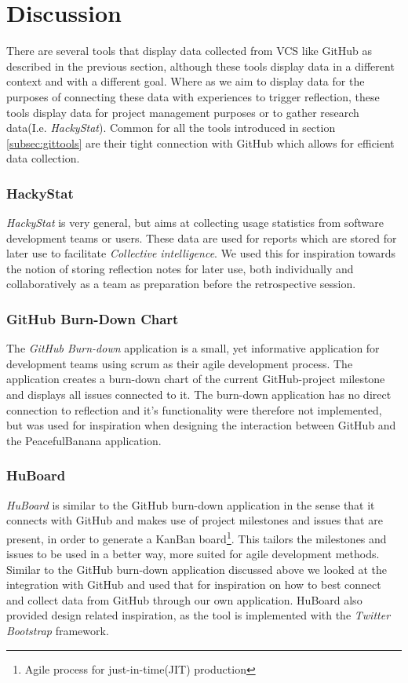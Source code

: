 \section{Discussion}
There are several tools that display data collected from VCS like GitHub as described in the previous section, although these tools display data in a different context and with a different goal. Where as we aim to display data for the purposes of connecting these data with experiences to trigger reflection, these tools display data for project management purposes or to gather research data(I.e. \emph{HackyStat}). Common for all the tools introduced in section \ref{subsec:gittools} are their tight connection with GitHub which allows for efficient data collection.

\subsubsection{HackyStat}
\emph{HackyStat} is very general, but aims at collecting usage statistics from software development teams or users. These data are used for reports which are stored for later use to facilitate \emph{Collective intelligence}. We used this for inspiration towards the notion of storing reflection notes for later use, both individually and collaboratively as a team as preparation before the retrospective session.   

\subsubsection{GitHub Burn-Down Chart}
The \emph{GitHub Burn-down} application is a small, yet informative application for development teams using scrum as their agile development process. The application creates a burn-down chart of the current GitHub-project milestone and displays all issues connected to it. The burn-down application has no direct connection to reflection and it's functionality were therefore not implemented, but was used for inspiration when designing the interaction between GitHub and the PeacefulBanana application. 

\subsubsection{HuBoard}
\emph{HuBoard} is similar to the GitHub burn-down application in the sense that it connects with GitHub and makes use of project milestones and issues that are present, in order to generate a KanBan board\footnote{Agile process for just-in-time(JIT) production}. This tailors the milestones and issues to be used in a better way, more suited for agile development methods. Similar to the GitHub burn-down application discussed above we looked at the integration with GitHub and used that for inspiration on how to best connect and collect data from GitHub through our own application. 
HuBoard also provided design related inspiration, as the tool is implemented with the \emph{Twitter Bootstrap} framework.

